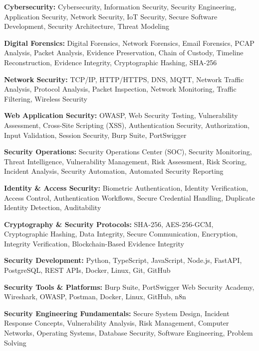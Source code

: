 \documentclass[a4paper,11pt]{article}
\begin{document}
\begin{itemize}[leftmargin=0in, label={}]

\small{

\item{
\textbf{Cybersecurity:} Cybersecurity, Information Security, Security Engineering, Application Security, Network Security, IoT Security, Secure Software Development, Security Architecture, Threat Modeling
}

\item{
\textbf{Digital Forensics:} Digital Forensics, Network Forensics, Email Forensics, PCAP Analysis, Packet Analysis, Evidence Preservation, Chain of Custody, Timeline Reconstruction, Evidence Integrity, Cryptographic Hashing, SHA-256
}

\item{
\textbf{Network Security:} TCP/IP, HTTP/HTTPS, DNS, MQTT, Network Traffic Analysis, Protocol Analysis, Packet Inspection, Network Monitoring, Traffic Filtering, Wireless Security
}

\item{
\textbf{Web Application Security:} OWASP, Web Security Testing, Vulnerability Assessment, Cross-Site Scripting (XSS), Authentication Security, Authorization, Input Validation, Session Security, Burp Suite, PortSwigger
}

\item{
\textbf{Security Operations:} Security Operations Center (SOC), Security Monitoring, Threat Intelligence, Vulnerability Management, Risk Assessment, Risk Scoring, Incident Analysis, Security Automation, Automated Security Reporting
}

\item{
\textbf{Identity \& Access Security:} Biometric Authentication, Identity Verification, Access Control, Authentication Workflows, Secure Credential Handling, Duplicate Identity Detection, Auditability
}

\item{
\textbf{Cryptography \& Security Protocols:} SHA-256, AES-256-GCM, Cryptographic Hashing, Data Integrity, Secure Communication, Encryption, Integrity Verification, Blockchain-Based Evidence Integrity
}

\item{
\textbf{Security Development:} Python, TypeScript, JavaScript, Node.js, FastAPI, PostgreSQL, REST APIs, Docker, Linux, Git, GitHub
}

\item{
\textbf{Security Tools \& Platforms:} Burp Suite, PortSwigger Web Security Academy, Wireshark, OWASP, Postman, Docker, Linux, GitHub, n8n
}

\item{
\textbf{Security Engineering Fundamentals:} Secure System Design, Incident Response Concepts, Vulnerability Analysis, Risk Management, Computer Networks, Operating Systems, Database Security, Software Engineering, Problem Solving
}

}

\end{itemize}
\end{document}
